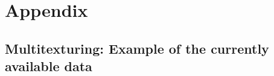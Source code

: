 \section{Appendix}

\subsection{Multitexturing: Example of the currently available data} \label{multitexturingAppendix}



